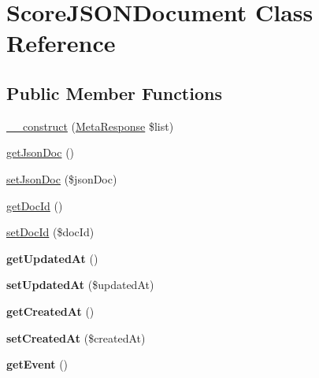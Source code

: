 \hypertarget{class_score_j_s_o_n_document}{\section{Score\+J\+S\+O\+N\+Document Class Reference}
\label{class_score_j_s_o_n_document}
}
\subsection*{Public Member Functions}
\begin{DoxyCompactItemize}
\item 
\hyperlink{class_score_j_s_o_n_document_a18fb96460e4fafed147956e173b5a6d9}{\+\_\+\+\_\+construct} (\hyperlink{class_meta_response}{Meta\+Response} \$list)
\item 
\hyperlink{class_score_j_s_o_n_document_aae5b452f6f5fd02ada80f134039354e3}{get\+Json\+Doc} ()
\item 
\hyperlink{class_score_j_s_o_n_document_a1f08feb6a944164520c4929531ca57b9}{set\+Json\+Doc} (\$json\+Doc)
\item 
\hyperlink{class_score_j_s_o_n_document_a87d709928426d7537de30a368b3cf4ab}{get\+Doc\+Id} ()
\item 
\hyperlink{class_score_j_s_o_n_document_a717889281baa3c165b58e34efce28fdb}{set\+Doc\+Id} (\$doc\+Id)
\item 
\hypertarget{class_score_j_s_o_n_document_a789bc1a92b41cf8c0958231bc1f27131}{{\bfseries get\+Updated\+At} ()}\label{class_score_j_s_o_n_document_a789bc1a92b41cf8c0958231bc1f27131}

\item 
\hypertarget{class_score_j_s_o_n_document_a154a3aa07459e180aee80106b8060cbd}{{\bfseries set\+Updated\+At} (\$updated\+At)}\label{class_score_j_s_o_n_document_a154a3aa07459e180aee80106b8060cbd}

\item 
\hypertarget{class_score_j_s_o_n_document_a0f0455d4aafe27d1b0720c3bcfff2847}{{\bfseries get\+Created\+At} ()}\label{class_score_j_s_o_n_document_a0f0455d4aafe27d1b0720c3bcfff2847}

\item 
\hypertarget{class_score_j_s_o_n_document_aab2c0066b72ff0696fde86c1d5b74538}{{\bfseries set\+Created\+At} (\$created\+At)}\label{class_score_j_s_o_n_document_aab2c0066b72ff0696fde86c1d5b74538}

\item 
\hypertarget{class_score_j_s_o_n_document_a055bcb2a2b197f7d31e1dd99d9eb62f7}{{\bfseries get\+Event} ()}\label{class_score_j_s_o_n_document_a055bcb2a2b197f7d31e1dd99d9eb62f7}


\end{DoxyCompactItemize}
